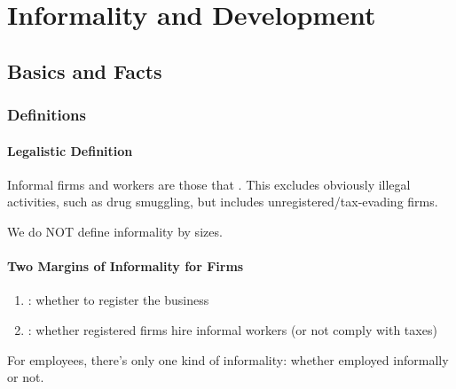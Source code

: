 \chapter{Informality and Development}



\section{Basics and Facts}
    \subsection{Definitions}
        \subsubsection{Legalistic Definition}
        
            Informal firms and workers are those that . This excludes obviously illegal activities, such as drug smuggling, but includes unregistered/tax-evading firms.
            
            We do NOT define informality by sizes.
            
        \subsubsection{Two Margins of Informality for Firms}
            \begin{enumerate}
                \item {}: whether to register the business
                \item {}: whether registered firms hire informal workers (or not comply with taxes)
            \end{enumerate}
            For employees, there's only one kind of informality: whether employed informally or not.
            

